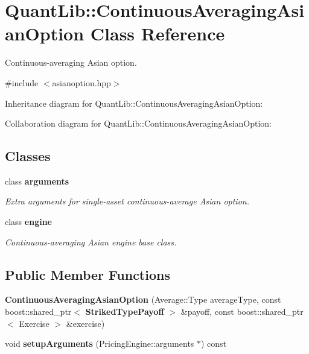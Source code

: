 \section{Quant\+Lib\+:\+:Continuous\+Averaging\+Asian\+Option Class Reference}
\label{class_quant_lib_1_1_continuous_averaging_asian_option}


Continuous-\/averaging Asian option.  




{\ttfamily \#include $<$asianoption.\+hpp$>$}



Inheritance diagram for Quant\+Lib\+:\+:Continuous\+Averaging\+Asian\+Option\+:


Collaboration diagram for Quant\+Lib\+:\+:Continuous\+Averaging\+Asian\+Option\+:
\subsection*{Classes}
\begin{DoxyCompactItemize}
\item 
class {\bf arguments}
\begin{DoxyCompactList}\small\item\em Extra arguments for single-\/asset continuous-\/average Asian option. \end{DoxyCompactList}\item 
class {\bf engine}
\begin{DoxyCompactList}\small\item\em Continuous-\/averaging Asian engine base class. \end{DoxyCompactList}\end{DoxyCompactItemize}
\subsection*{Public Member Functions}
\begin{DoxyCompactItemize}
\item 
{\bfseries Continuous\+Averaging\+Asian\+Option} (Average\+::\+Type average\+Type, const boost\+::shared\+\_\+ptr$<$ {\bf Striked\+Type\+Payoff} $>$ \&payoff, const boost\+::shared\+\_\+ptr$<$ Exercise $>$ \&exercise)\label{class_quant_lib_1_1_continuous_averaging_asian_option_a3a91f956764aa73ad0f8ab054a55fde3}

\item 
void {\bfseries setup\+Arguments} (Pricing\+Engine\+::arguments $\ast$) const \label{class_quant_lib_1_1_continuous_averaging_asian_option_a6efe82ef285840015c7424f550782d9e}

\end{DoxyCompactItemize}
